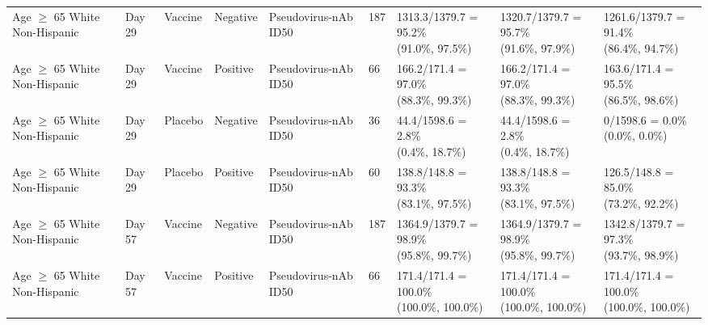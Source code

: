 \documentclass[]{book}
\theoremstyle{definition}
\theoremstyle{definition}
\theoremstyle{definition}
\newcommand{\1}{\mathbbm{1}}
\begin{document}
\begin{landscape}
\begin{ThreePartTable}
\begin{longtable}[t]{>{\raggedright\arraybackslash}p{2.7cm}llllllll}
\hspace{1em}Age $\geq$ 65 White Non-Hispanic & Day 29 & Vaccine & Negative & Pseudovirus-nAb ID50 & 187 & \makecell[l]{1313.3/1379.7 = 95.2\%\\(91.0\%, 97.5\%)} & \makecell[l]{1320.7/1379.7 = 95.7\%\\(91.6\%, 97.9\%)} & \makecell[l]{1261.6/1379.7 = 91.4\%\\(86.4\%, 94.7\%)}\\
\hspace{1em}Age $\geq$ 65 White Non-Hispanic & Day 29 & Vaccine & Positive & Pseudovirus-nAb ID50 & 66 & \makecell[l]{166.2/171.4 = 97.0\%\\(88.3\%, 99.3\%)} & \makecell[l]{166.2/171.4 = 97.0\%\\(88.3\%, 99.3\%)} & \makecell[l]{163.6/171.4 = 95.5\%\\(86.5\%, 98.6\%)}\\
\hspace{1em}Age $\geq$ 65 White Non-Hispanic & Day 29 & Placebo & Negative & Pseudovirus-nAb ID50 & 36 & \makecell[l]{44.4/1598.6 = 2.8\%\\(0.4\%, 18.7\%)} & \makecell[l]{44.4/1598.6 = 2.8\%\\(0.4\%, 18.7\%)} & \makecell[l]{0/1598.6 = 0.0\%\\(0.0\%, 0.0\%)}\\
\hspace{1em}Age $\geq$ 65 White Non-Hispanic & Day 29 & Placebo & Positive & Pseudovirus-nAb ID50 & 60 & \makecell[l]{138.8/148.8 = 93.3\%\\(83.1\%, 97.5\%)} & \makecell[l]{138.8/148.8 = 93.3\%\\(83.1\%, 97.5\%)} & \makecell[l]{126.5/148.8 = 85.0\%\\(73.2\%, 92.2\%)}\\
\hspace{1em}Age $\geq$ 65 White Non-Hispanic & Day 57 & Vaccine & Negative & Pseudovirus-nAb ID50 & 187 & \makecell[l]{1364.9/1379.7 = 98.9\%\\(95.8\%, 99.7\%)} & \makecell[l]{1364.9/1379.7 = 98.9\%\\(95.8\%, 99.7\%)} & \makecell[l]{1342.8/1379.7 = 97.3\%\\(93.7\%, 98.9\%)}\\
\hspace{1em}Age $\geq$ 65 White Non-Hispanic & Day 57 & Vaccine & Positive & Pseudovirus-nAb ID50 & 66 & \makecell[l]{171.4/171.4 = 100.0\%\\(100.0\%, 100.0\%)} & \makecell[l]{171.4/171.4 = 100.0\%\\(100.0\%, 100.0\%)} & \makecell[l]{171.4/171.4 = 100.0\%\\(100.0\%, 100.0\%)}\\

\end{longtable}
\end{ThreePartTable}
\end{landscape}
\end{document}
